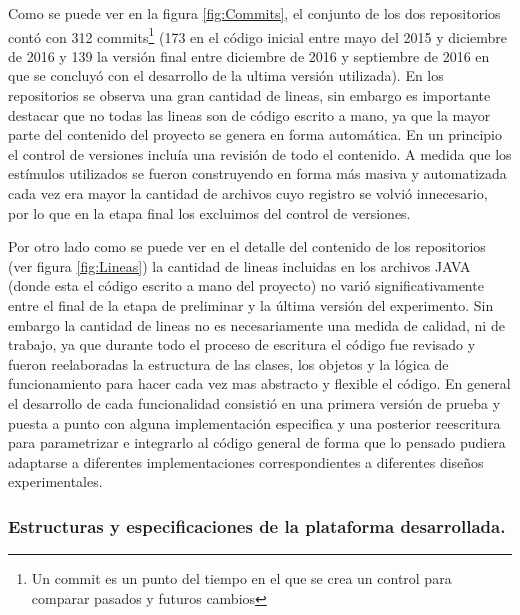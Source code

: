 \documentclass{article}
\begin{document}
    Como se puede ver en la figura \ref{fig:Commits}, el conjunto de los dos repositorios contó con 312 commits\footnote{Un commit es un punto del tiempo en el que se crea un control para comparar pasados y futuros cambios} (173 en el código inicial entre mayo del 2015 y diciembre de 2016 y 139 la versión final entre diciembre de 2016 y septiembre de 2016 en que se concluyó con el desarrollo de la ultima versión utilizada). En los repositorios se observa una gran cantidad de lineas, sin embargo es importante destacar que no todas las lineas son de código escrito a mano, ya que la mayor parte del contenido del proyecto se genera en forma automática. En un principio el control de versiones incluía una revisión de todo el contenido. A medida que los estímulos utilizados se fueron construyendo en forma más masiva y automatizada cada vez era mayor la cantidad de archivos cuyo registro se volvió innecesario, por lo que en la etapa final los excluimos del control de versiones. 
    
    Por otro lado como se puede ver en el detalle del contenido de los repositorios (ver figura \ref{fig:Lineas}) la cantidad de lineas incluidas en los archivos JAVA (donde esta el código escrito a mano del proyecto) no varió significativamente entre el final de la etapa de preliminar y la última versión del experimento. Sin embargo la cantidad de lineas no es necesariamente una medida de calidad, ni de trabajo, ya que durante todo el proceso de escritura el código fue revisado y fueron reelaboradas la estructura de las clases, los objetos y la lógica de funcionamiento para hacer cada vez mas abstracto y flexible el código. En general el desarrollo de cada funcionalidad consistió en una primera versión de prueba y puesta a punto con alguna implementación especifica y una posterior reescritura para parametrizar e integrarlo al código general de forma que lo pensado pudiera adaptarse a diferentes implementaciones correspondientes a diferentes diseños experimentales. 
    
    \subsubsection{Estructuras y especificaciones de la plataforma desarrollada.}
    
\end{document}
